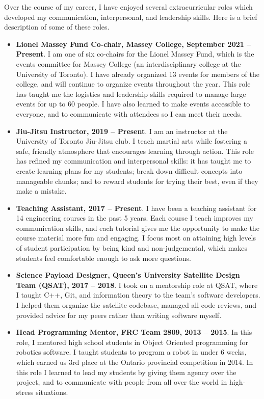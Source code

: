\documentclass[a4paper,12pt]{article}
\begin{document}
Over the course of my career, I have enjoyed several extracurricular
roles which developed my communication, interpersonal, and leadership skills.
Here is a brief description of some of these roles.
\begin{itemize}
\item \textbf{Lionel Massey Fund Co-chair, Massey College, September 2021 -- Present}.
    I am one of six co-chairs for the Lionel Massey Fund, which is the events
    committee for Massey College (an interdisciplinary college at the University
    of Toronto).
    I have already organized 13 events for members of the college, and will
    continue to organize events throughout the year.
    This role has taught me the logistics and leadership skills required to
    manage large events for up to 60 people.
    I have also learned to make events accessible to everyone, and to
    communicate with attendees so I can meet their needs.

\item \textbf{Jiu-Jitsu Instructor, 2019 -- Present}. 
    I am an instructor at the University of Toronto Jiu-Jitsu club. I teach
    martial arts while fostering a safe, friendly atmosphere that
    encourages learning through action.
    This role has refined my communication and interpersonal skills:
    it has taught me to create learning plans for my students;
    break down difficult concepts into manageable chunks; 
    and to reward students for trying their best, even if they make a mistake.

\item \textbf{Teaching Assistant, 2017 -- Present}.
    I have been a teaching assistant for 14 engineering courses in the past 5 years.
    Each course I teach improves my communication skills, and each tutorial gives
    me the opportunity to make the course material more fun and engaging.
    I focus most on attaining high levels of student participation by being
    kind and non-judgemental, which makes students feel
    comfortable enough to ask more questions.

\item \textbf{Science Payload Designer, Queen’s University Satellite Design
    Team (QSAT), 2017 -- 2018}. 
    I took on a mentorship role at QSAT, where I taught C++, Git, and information
    theory to the team’s software developers. I helped them organize
    the satellite codebase, managed all code reviews, and provided advice for my
    peers rather than writing software myself.

\item \textbf{Head Programming Mentor, FRC Team 2809, 2013 -- 2015}. 
    In this role, I mentored high school students in Object Oriented programming
    for robotics software. I taught students to program a robot in under 6
    weeks, which earned us 3rd place at the Ontario provincial competition in
    2014.
    In this role I learned to lead my students by giving them agency over the
    project, and to communicate with people from all over the world in
    high-stress situations.

\end{itemize}
\end{document}
